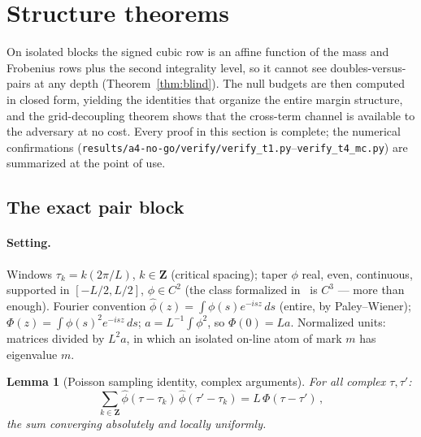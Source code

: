 \documentclass[11pt]{article}
\theoremstyle{plain}
\newtheorem{lemma}[theorem]{Lemma}
\theoremstyle{definition}
\theoremstyle{remark}
\newcommand{\Z}{\mathbf{Z}}
\newcommand{\ph}{\widehat{\phi}}
\begin{document}
\section{Structure theorems}
\label{sec:structure}

On isolated blocks the signed cubic row is an affine function of the mass and
Frobenius rows plus the second integrality level, so it cannot see
doubles-versus-pairs at any depth (Theorem~\ref{thm:blind}). The null budgets
are then computed in closed form, yielding the identities that organize the
entire margin structure, and the grid-decoupling theorem shows that the
cross-term channel is available to the adversary at no cost. Every proof in this
section is complete; the numerical confirmations
(\texttt{results/a4-no-go/}\allowbreak\texttt{verify/verify\_t1.py}--\texttt{verify\_t4\_mc.py})
are summarized at the point of use.

\subsection{The exact pair block}
\label{sec:pairblock}

\paragraph{Setting.}
Windows $\tau_k = k(2\pi/L)$, $k \in \Z$ (critical spacing); taper $\phi$ real,
even, continuous, supported in $[-L/2, L/2]$, $\phi \in C^2$ (the class
formalized in~\cite{AF26} is $C^3$ --- more than enough). Fourier convention
$\ph(z) = \int \phi(s) e^{-i s z}\, ds$ (entire, by Paley--Wiener);
$\Phi(z) = \int \phi(s)^2 e^{-i s z}\, ds$; $a = L^{-1} \int \phi^2$, so
$\Phi(0) = L a$. Normalized units: matrices divided by $L^2 a$, in which an
isolated on-line atom of mark $m$ has eigenvalue $m$.

\begin{lemma}[Poisson sampling identity, complex arguments]
\label{lem:poisson}
For all complex $\tau, \tau'$:
\[
  \sum_{k \in \Z} \ph(\tau - \tau_k)\, \ph(\tau' - \tau_k)
  = L\, \Phi(\tau - \tau')\,,
\]
the sum converging absolutely and locally uniformly.
\end{lemma}
\end{document}
